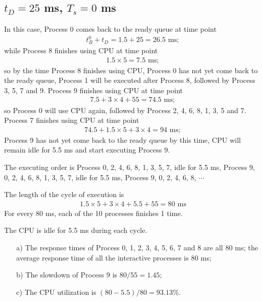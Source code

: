 \documentclass[12pt,letterpaper]{article}
\begin{document}
\subsection{$t_D=25$ ms, $T_s = 0$ ms}
In this case, Process 0 comes back to the ready queue at time point
\begin{eqnarray}
t_B^0+t_D=1.5+25=26.5\textrm{ ms};
\end{eqnarray}
while Process 8 finishes using CPU at time point 
\begin{eqnarray}
1.5\times5=7.5\textrm{ ms};
\end{eqnarray}
so by the time Process 8 finishes using CPU, Process 0 has not yet come back to the ready queue, Process 1 will be executed after Process 8, followed by Process 3, 5, 7 and 9. Process 9 finishes using CPU at time point
\begin{eqnarray}
7.5+3\times4+55=74.5\textrm{ ms};
\end{eqnarray}
so Process 0 will use CPU again, followed by Process 2, 4, 6, 8, 1, 3, 5 and 7. Process 7 finishes using CPU at time point
\begin{eqnarray}
74.5+1.5\times5+3\times4=94\textrm{ ms};
\end{eqnarray}
Process 9 has not yet come back to the ready queue by this time, CPU will remain idle for 5.5 ms and start executing Process 9.

The executing order is Process 0, 2, 4, 6, 8, 1, 3, 5, 7, idle for 5.5 ms, Process 9, 0, 2, 4, 6, 8, 1, 3, 5, 7, idle for 5.5 ms, Process 9, 0, 2, 4, 6, 8, $\cdots$

The length of the cycle of execution is 
\begin{eqnarray}
1.5\times5+3\times4+5.5+55=80\textrm{ ms}
\end{eqnarray}
For every 80 ms, each of the 10 processes finishes 1 time.

The CPU is idle for 5.5 ms during each cycle.

\begin{enumerate}
\item[a)] The response times of Process 0, 1, 2, 3, 4, 5, 6, 7 and 8 are all 80 ms; the average response time of all the interactive processes is 80 ms;
\item[b)] The slowdown of Process 9 is $80/55=1.45$;
\item[c)] The CPU utilization is $(80-5.5)/80=93.13\%$.
\end{enumerate}
\end{document}
